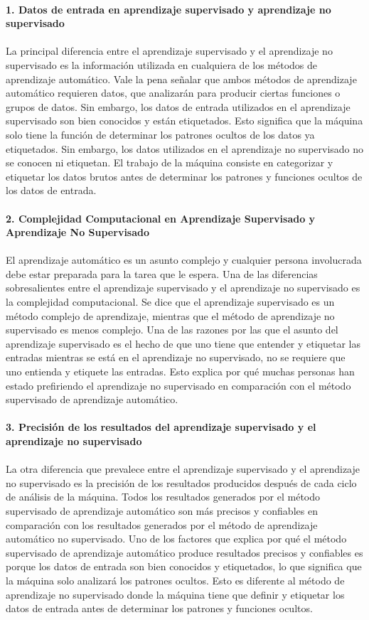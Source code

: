 \documentclass[%
 reprint,
 amsmath,amssymb,
 aps,
]{revtex4-1}
\begin{document}
\textbf{}\\  
\textbf{1. Datos de entrada en aprendizaje supervisado y aprendizaje no supervisado}\\  
\textbf{}\\  
La principal diferencia entre el aprendizaje supervisado y el aprendizaje no supervisado es la información utilizada en cualquiera de los métodos de aprendizaje automático. Vale la pena señalar que ambos métodos de aprendizaje automático requieren datos, que analizarán para producir ciertas funciones o grupos de datos. Sin embargo, los datos de entrada utilizados en el aprendizaje supervisado son bien conocidos y están etiquetados. Esto significa que la máquina solo tiene la función de determinar los patrones ocultos de los datos ya etiquetados. Sin embargo, los datos utilizados en el aprendizaje no supervisado no se conocen ni etiquetan. El trabajo de la máquina consiste en categorizar y etiquetar los datos brutos antes de determinar los patrones y funciones ocultos de los datos de entrada.
\textbf{}\\  
\textbf{}\\  
\textbf{2. Complejidad Computacional en Aprendizaje Supervisado y Aprendizaje No Supervisado}\\  
\textbf{}\\  
El aprendizaje automático es un asunto complejo y cualquier persona involucrada debe estar preparada para la tarea que le espera. Una de las diferencias sobresalientes entre el aprendizaje supervisado y el aprendizaje no supervisado es la complejidad computacional. Se dice que el aprendizaje supervisado es un método complejo de aprendizaje, mientras que el método de aprendizaje no supervisado es menos complejo. Una de las razones por las que el asunto del aprendizaje supervisado es el hecho de que uno tiene que entender y etiquetar las entradas mientras se está en el aprendizaje no supervisado, no se requiere que uno entienda y etiquete las entradas. Esto explica por qué muchas personas han estado prefiriendo el aprendizaje no supervisado en comparación con el método supervisado de aprendizaje automático.
\textbf{}\\  
\textbf{}\\  
\textbf{3. Precisión de los resultados del aprendizaje supervisado y el aprendizaje no supervisado}\\  
\textbf{}\\  
La otra diferencia que prevalece entre el aprendizaje supervisado y el aprendizaje no supervisado es la precisión de los resultados producidos después de cada ciclo de análisis de la máquina. Todos los resultados generados por el método supervisado de aprendizaje automático son más precisos y confiables en comparación con los resultados generados por el método de aprendizaje automático no supervisado. Uno de los factores que explica por qué el método supervisado de aprendizaje automático produce resultados precisos y confiables es porque los datos de entrada son bien conocidos y etiquetados, lo que significa que la máquina solo analizará los patrones ocultos. Esto es diferente al método de aprendizaje no supervisado donde la máquina tiene que definir y etiquetar los datos de entrada antes de determinar los patrones y funciones ocultos.
\end{document}
